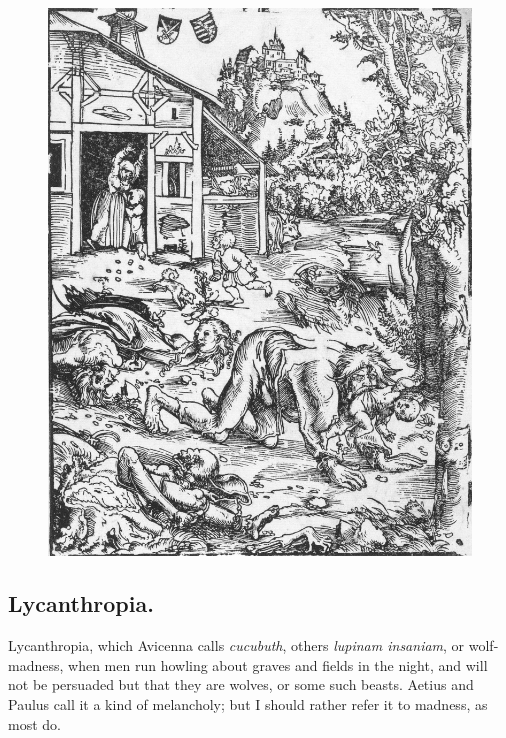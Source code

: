 {\begin{figure}[p]
  \begingroup
  \centering
  \includegraphics[keepaspectratio,width=\textwidth]{figures/Werewolf-with-bodies-small.jpg}
  \label{fig:werewolf}
\end{figure}

\clearpage{}
\subsection{Lycanthropia.}
Lycanthropia, which Avicenna calls \emph{cucubuth}, others
\emph{lupinam insaniam}, or wolf-madness, when men run howling about graves
and fields in the night, and will not be persuaded but that they are
wolves, or some such beasts. Aetius and Paulus call it a kind
of melancholy; but I should rather refer it to madness, as most do.

}
